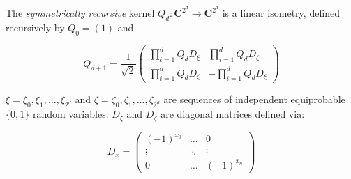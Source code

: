 \documentclass[10pt]{article}
\begin{document}
The \textit{symmetrically recursive} kernel $Q_d:\mathbf{C}^{2^d}\to\mathbf{C}^{2^d}$ is a linear isometry, defined recursively by $Q_0=\left(1\right)$ and

\[
Q_{d+1}=\frac{1}{\sqrt{2}}
\left(
\begin{matrix}
\prod_{i=1}^d Q_d D_{\xi}& \prod_{i=1}^d  Q_d D_{\zeta}\\
\prod_{i=1}^d Q_d D_{\zeta}& -\prod_{i=1}^d  Q_d D_{\xi}
\end{matrix}\right)
\]

$\xi=\xi_0,\xi_1,\dots,\xi_{2^d}$ and $\zeta=\zeta_0,\zeta_1,\dots,\zeta_{2^d}$ are sequences of independent equiprobable $\{0,1\}$ random variables. $D_{\xi}$ and $D_{\zeta}$ are diagonal matrices defined via:

\[
D_x = \left(
\begin{matrix}
(-1)^{x_0} & \dots & 0 \\
\vdots & \ddots & \vdots \\
0 & \dots & (-1)^{x_n}
\end{matrix}\right)
\]
\end{document}
